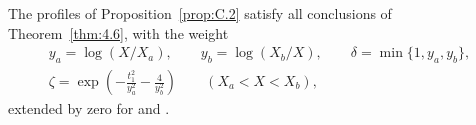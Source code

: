 \begin{proposition}\label{prop:C.3}
The profiles of Proposition~\ref{prop:C.2} satisfy all conclusions of
Theorem~\ref{thm:4.6}, with the weight
\begin{equation}
\begin{gathered}
  y_a=\log(X/X_a),
  \qquad y_b=\log(X_b/X),
  \qquad \delta=\min\{1,y_a,y_b\},\\
  \zeta=\exp\!\left(-\frac{t_1^2}{y_a^2}-\frac{4}{y_b^2}\right)
  \qquad (X_a<X<X_b),
\end{gathered}
\tag{C.18}\label{eq:C.18}
\end{equation}
extended by zero for  and
.
\end{proposition}

